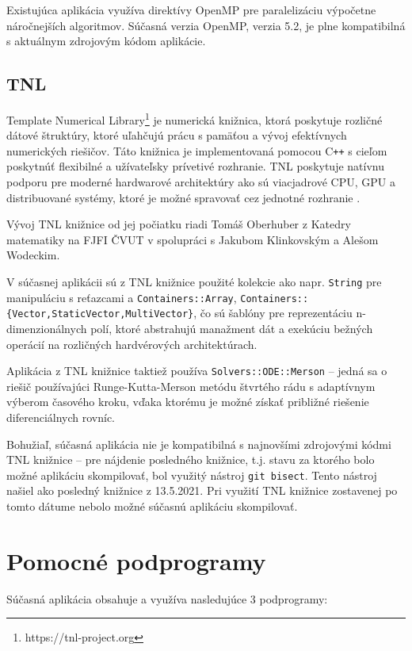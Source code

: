Existujúca aplikácia využíva direktívy OpenMP pre paralelizáciu výpočetne náročnejších algoritmov. Súčasná verzia OpenMP, verzia 5.2, je plne kompatibilná s aktuálnym zdrojovým kódom aplikácie.

\subsection {TNL}\label{tnl}
Template Numerical Library\footnote{https://tnl-project.org} je numerická knižnica, ktorá poskytuje rozličné dátové štruktúry, ktoré uľahčujú prácu s pamäťou a vývoj efektívnych numerických riešičov. Táto knižnica je implementovaná pomocou C\texttt{++} s cieľom poskytnúť flexibilné a užívateľsky prívetivé rozhranie. TNL poskytuje natívnu podporu pre moderné hardwarové architektúry ako sú viacjadrové CPU, GPU a distribuované systémy, ktoré je možné spravovať cez jednotné rozhranie \cite{tnl_description}.

Vývoj TNL knižnice od jej počiatku riadi Tomáš Oberhuber z Katedry matematiky na FJFI ČVUT v spolupráci s Jakubom Klinkovským a Alešom Wodeckim.

V súčasnej aplikácii sú z TNL knižnice použité kolekcie ako napr. \texttt{String} pre manipuláciu s reťazcami a \texttt{Containers::Array}, \texttt{Containers::\{Vector,\newline StaticVector,MultiVector\}}, čo sú šablóny pre reprezentáciu \newline n-dimenzionálnych polí, ktoré abstrahujú manažment dát a exekúciu bežných operácií na rozličných hardvérových architektúrach.

Aplikácia z TNL knižnice taktiež používa \texttt{Solvers::ODE::Merson} -- jedná sa o riešič používajúci Runge-Kutta-Merson metódu štvrtého rádu s adaptívnym výberom časového kroku, vďaka ktorému je možné získať približné riešenie diferenciálnych rovníc.

Bohužiaľ, súčasná aplikácia nie je kompatibilná s najnovšími zdrojovými kódmi TNL knižnice -- pre nájdenie posledného  knižnice, t.j. stavu za ktorého bolo možné aplikáciu skompilovať, bol využitý nástroj \texttt{git bisect}. Tento nástroj našiel ako posledný  knižnice z 13.5.2021. Pri využití TNL knižnice zostavenej po tomto dátume nebolo možné súčasnú aplikáciu skompilovať.

\section {Pomocné podprogramy}\label{helper_apps}
Súčasná aplikácia obsahuje a využíva nasledujúce 3 podprogramy:


